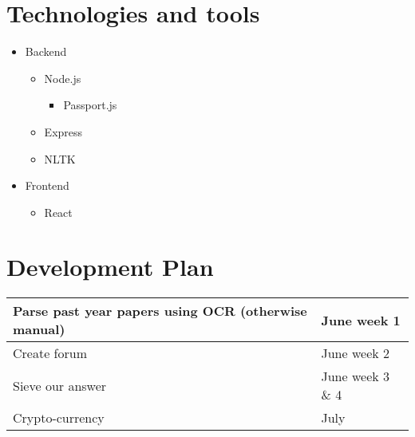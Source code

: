 \documentclass[12pt,a4paper]{article}
\begin{document}
\section{Technologies and tools}
\begin{itemize}
    \item Backend
    \begin{itemize}
        \item Node.js
            \begin{itemize}
                \item Passport.js
            \end{itemize}
        \item Express
        \item NLTK
     \end{itemize}
\item Frontend
    \begin{itemize}
        \item React
    \end{itemize}
\end{itemize}

\section{Development Plan}
\begin{tabular}[pos]{| l | l |}
    \hline
    Parse past year papers using OCR (otherwise manual) & June week 1 \\
    \hline
    Create forum & June week 2  \\
    \hline
    Sieve our answer & June week 3 \& 4 \\
    \hline
    Crypto-currency & July \\
    \hline
\end{tabular}
\end{document}
